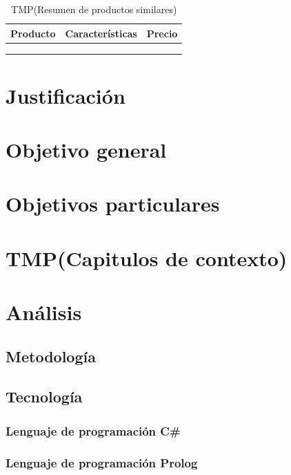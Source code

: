 \documentclass[12pt,twoside]{article}
\begin{document}
	\begin{table}[H]
		\centering
		\begin{tabular}{|c|p{4cm}|c|}
			\hline
			Producto & Características & Precio \\ \hline
			 & &  \\ \hline
			 & &  \\ \hline
			 & &  \\ \hline
		\end{tabular}
		\caption{TMP(Resumen de productos similares)}
		\label{tabla:estado_del_arte}
	\end{table} 
	
	\section{Justificación}
	
	\section{Objetivo general}
	
	\section{Objetivos particulares}
	
	\section{TMP(Capitulos de contexto)}
	
	\section{Análisis}
	
	\subsection{Metodología}

	\subsection{Tecnología}	%

	\subsubsection{Lenguaje de programación C\#}
	
	\subsubsection{Lenguaje de programación Prolog}
	
\end{document}
